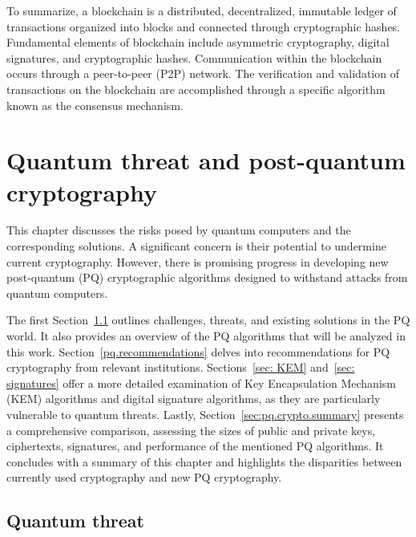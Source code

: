 To summarize, a blockchain is a distributed, decentralized, immutable ledger of transactions organized into blocks and connected through cryptographic hashes. Fundamental elements of blockchain include asymmetric cryptography, digital signatures, and cryptographic hashes. Communication within the blockchain occurs through a peer-to-peer (P2P) network. The verification and validation of transactions on the blockchain are accomplished through a specific algorithm known as the consensus mechanism.


\chapter{Quantum threat and post-quantum cryptography}
\label{Quantum threat and Post-quantum cryptography}

This chapter discusses the risks posed by quantum computers and the corresponding solutions. A significant concern is their potential to undermine current cryptography. However, there is promising progress in developing new post-quantum (PQ) cryptographic algorithms designed to withstand attacks from quantum computers.

The first Section~\ref{Quantum threat} outlines challenges, threats, and existing solutions in the PQ world. It also provides an overview of the PQ algorithms that will be analyzed in this work. Section~\ref{pq.recommendations} delves into recommendations for PQ cryptography from relevant institutions. Sections~\ref{sec: KEM} and~\ref{sec: signatures} offer a more detailed examination of Key Encapsulation Mechanism (KEM) algorithms and digital signature algorithms, as they are particularly vulnerable to quantum threats. Lastly, Section~\ref{sec:pq.crypto.summary} presents a comprehensive comparison, assessing the sizes of public and private keys, ciphertexts, signatures, and performance of the mentioned PQ algorithms. It concludes with a summary of this chapter and highlights the disparities between currently used cryptography and new PQ cryptography.



\section{Quantum threat}
\label{Quantum threat}

